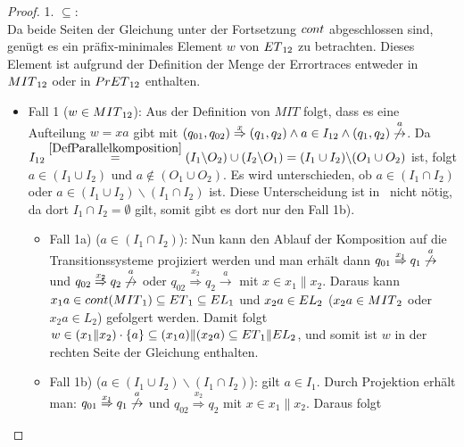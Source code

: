 \begin{proof}
  1. \glqq{}$\subseteq$\grqq{}:\\
  Da beide Seiten der Gleichung unter der Fortsetzung $cont{}$ abgeschlossen sind, genügt es ein
  präfix-minimales Element $w$ von $ET{}_{12}$ zu betrachten. Dieses Element ist
  aufgrund der Definition der Menge der Errortraces entweder in $MIT{}_{12}$ oder in
  $PrET{}_{12}$ enthalten.
  \begin{itemize}
    \item Fall 1 ($w\in MIT{}_{12}$): Aus der Definition von $MIT$ folgt, dass es eine
  Aufteilung $w=xa$ gibt mit $(q_{01},q_{02})
  \overset{x}{\Rightarrow}(q_1,q_2)\wedge a\in I_{12}\wedge (q_1,q_2)
  \overset{a}{\not{\hspace{-0.1cm}\rightarrow}}$. Da $I_{12}
  \overset{\ref{DefParallelkomposition}}{=}(I_1\backslash O_2)\cup
  (I_2\backslash O_1)=(I_1\cup I_2)\backslash (O_1\cup O_2)$ ist, folgt $a\in (I_1\cup
  I_2)$ und $a\notin (O_1\cup O_2)$. Es wird unterschieden, ob $a\in (I_1\cap I_2)$
  oder $a\in (I_1\cup I_2)\backslash (I_1\cap I_2)$ ist. Diese Unterscheidung
  ist in~\cite{Vogler2014EIO} nicht nötig, da dort $I_1\cap I_2=\emptyset$
  gilt, somit gibt es dort nur den Fall 1b).
  \begin{itemize}
    \item Fall 1a) ($a\in (I_1\cap I_2)$): Nun kann den Ablauf der
      Komposition auf die Transitionssysteme projiziert werden und man erhält dann \oBdA{}
      $q_{01}\overset{x_1}{\Rightarrow} q_1
      \overset{a}{\not{\hspace{-0.1cm}\rightarrow}}$ und
      $q_{02}\overset{x_2}{\Rightarrow} q_2
      \overset{a}{\not{\hspace{-0.1cm}\rightarrow}}$ oder
      $q_{02}\overset{x_2}{\Rightarrow} q_2 \overset{a}{\rightarrow}$ mit $x\in
      x_1\|x_2$. Daraus kann $x_1a\in cont{}(MIT{}_1)\subseteq ET{}_1\subseteq
      EL{}_1$ und $x_2a\in EL{}_2$ ($x_2a\in MIT{}_2$ oder $x_2a\in L_2$)
      gefolgert werden. Damit folgt $w\in (x_1\|x_2)\cdot\{a\}\subseteq
      (x_1a)\|(x_2a)\subseteq ET{}_1\|EL{}_2$, und somit ist $w$ in der
      rechten Seite der Gleichung enthalten.
  \item Fall 1b) ($a\in (I_1\cup I_2)\backslash(I_1\cap I_2)$): \OBdA{} gilt
      $a\in I_1$. Durch Projektion erhält man:
      $q_{01}\overset{x_1}{\Rightarrow} q_1
      \overset{a}{\not{\hspace{-0.1cm}\rightarrow}}$ und
      $q_{02}\overset{x_2}{\Rightarrow} q_2$ mit $x\in x_1\|x_2$. Daraus folgt

\end{itemize}
\end{itemize}
\end{proof}

